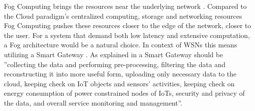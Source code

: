 \documentclass[]{uiophd}
\begin{document}
Fog Computing brings the resources near the underlying network \cite{6984239}. Compared to the Cloud paradigm's centralized computing, storage and networking resources Fog Computing pushes these resources closer to the edge of the network, closer to the user. For a system that demand both low latency and extensive computation, a Fog architecture would be a natural choice. In context of WSNs this means utilizing a Smart Gateway \cite{6984239}. As explained in \cite{69842392} a Smart Gateway should be ''collecting the data and performing pre-processing, filtering the data and reconstructing it into more useful form, uploading only necessary data to the cloud, keeping check on IoT objects and sensors’ activities, keeping check on energy consumption of power constrained nodes of IoTs, security and privacy of the data, and overall service monitoring and management''. 
\end{document}
